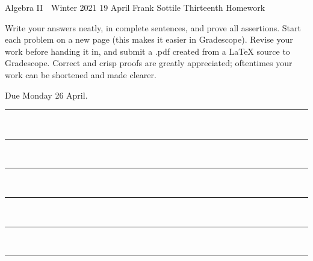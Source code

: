 \documentclass[12pt]{article}
\newcommand{\barsl}{\noindent\begin{minipage}[t]{575pt}
{\color{violet}\rule{575pt}{1.2pt}}\vspace{-5.7mm}\\
{\color{blue}\rule{575pt}{1.2pt}}\vspace{-5.7mm}\\
{\color{green}\rule{575pt}{1.2pt}}\vspace{-5.7mm}\\
{\color{yellow}\rule{575pt}{1.2pt}}\vspace{-5.7mm}\\
{\color{orange}\rule{575pt}{1.2pt}}\vspace{-5.7mm}\\
{\color{red}\rule{575pt}{1.2pt}}
\end{minipage}}
\begin{document}
\LARGE 
\noindent
Algebra II\ \ Winter 2021 \hfill 19 April\makebox[40pt][l]{\ }\newline
Frank Sottile \hfill
\Large\sf
Thirteenth Homework\makebox[40pt][l]{\ }
\vspace{5pt}
\normalsize

\noindent
Write your answers neatly, in complete sentences, and prove all assertions.
Start each problem on a new page (this makes it easier in Gradescope).
Revise your work before handing it in, and submit a .pdf  created from a LaTeX source to Gradescope.
Correct and crisp proofs are greatly appreciated; oftentimes your work can be shortened and made clearer.

\noindent
{\color{red}Due Monday 26 April.}\vspace{1pt}

\barsl
\end{document}
